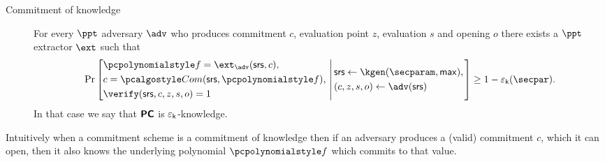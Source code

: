 \documentclass[runningheads,11pt]{llncs}
\begin{document}
\begin{description}
\item[Commitment of knowledge]  For every $\ppt$ adversary $\adv$ who produces
  commitment $c$, evaluation point $z$, evaluation $s$ and opening $o$ there
  exists a $\ppt$ extractor $\ext$ such that
\[
  \Pr \left[
    \begin{aligned}
      & \p{f} = \ext_\adv(\srs, c),\\
      & c = \com(\srs, \p{f}),\\
      & \verify(\srs, c, z, s, o) = 1
    \end{aligned}
    \,\left|\,
      \vphantom{
        \begin{aligned}
          & \\
          & \\
          &
        \end{aligned}
        }
    \begin{aligned}
      & \srs \gets \kgen(\secparam, \maxdeg),\\
      & (c, z, s, o) \gets \adv(\srs)
    \end{aligned}
  \right.\right]
  \geq 1 - \epsk(\secpar).
\]
In that case we say that $\bm{\mathsf{PC}}$ is $\varepsilon_{\mathsf{k}}$-knowledge.
\end{description}
Intuitively when a commitment scheme is a commitment of knowledge then if an
adversary produces a (valid) commitment $c$, which it can open, then it also
knows the underlying polynomial $\p{f}$ which commits to that value.
\end{document}
